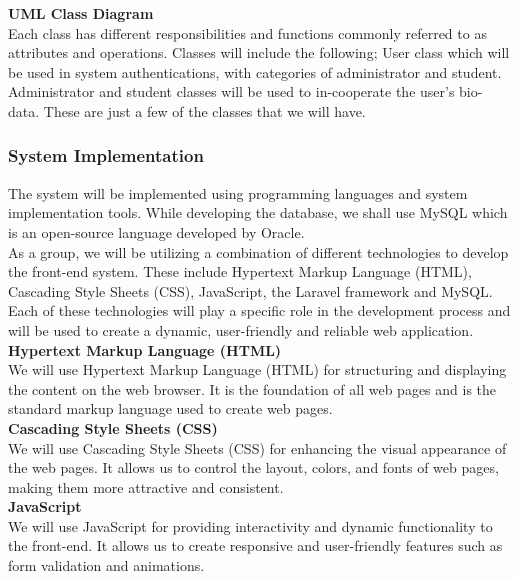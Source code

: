 \documentclass {article}
\begin{document}
\noindent \textbf{UML Class Diagram \\}
\noindent Each class has different responsibilities and functions commonly referred to as attributes and operations. Classes will include the following; User class which will be used in system authentications, with categories of administrator and student. Administrator and student classes will be used to in-cooperate the user’s bio-data. These are just a few of the classes that we will have.

\subsubsection{System Implementation}
\noindent The system will be implemented using programming languages and system implementation tools. While developing the database, we shall use MySQL which is an open-source language developed by Oracle.  \\

\noindent As a group, we will be utilizing a combination of different technologies to develop the front-end system. These include Hypertext Markup Language (HTML), Cascading Style Sheets (CSS), JavaScript, the Laravel framework and MySQL. Each of these technologies will play a specific role in the development process and will be used to create a dynamic, user-friendly and reliable web application. \\

\noindent \textbf{Hypertext Markup Language (HTML)\\}
\noindent We will use Hypertext Markup Language (HTML) for structuring and displaying the content on the web browser. It is the foundation of all web pages and is the standard markup language used to create web pages.\\

\noindent \textbf{Cascading Style Sheets (CSS)\\}
\noindent We will use Cascading Style Sheets (CSS) for enhancing the visual appearance of the web pages. It allows us to control the layout, colors, and fonts of web pages, making them more attractive and consistent.\\

\noindent \textbf{JavaScript\\}
\noindent We will use JavaScript for providing interactivity and dynamic functionality to the front-end. It allows us to create responsive and user-friendly features such as form validation and animations.\\
\end{document}

